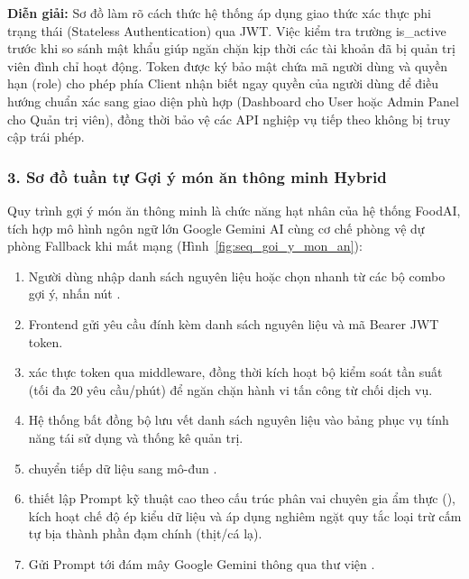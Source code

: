 \noindent\textbf{Diễn giải:} Sơ đồ làm rõ cách thức hệ thống áp dụng giao thức xác thực phi trạng thái (Stateless Authentication) qua JWT. Việc kiểm tra trường is\_active trước khi so sánh mật khẩu giúp ngăn chặn kịp thời các tài khoản đã bị quản trị viên đình chỉ hoạt động. Token được ký bảo mật chứa mã người dùng và quyền hạn (role) cho phép phía Client nhận biết ngay quyền của người dùng để điều hướng chuẩn xác sang giao diện phù hợp (Dashboard cho User hoặc Admin Panel cho Quản trị viên), đồng thời bảo vệ các API nghiệp vụ tiếp theo không bị truy cập trái phép.

\subsubsection{3. Sơ đồ tuần tự Gợi ý món ăn thông minh Hybrid}

Quy trình gợi ý món ăn thông minh là chức năng hạt nhân của hệ thống FoodAI, tích hợp mô hình ngôn ngữ lớn Google Gemini AI cùng cơ chế phòng vệ dự phòng Fallback khi mất mạng (Hình~\ref{fig:seq_goi_y_mon_an}):
\begin{enumerate}[leftmargin=1.6em, itemsep=2pt]
  \item Người dùng nhập danh sách nguyên liệu hoặc chọn nhanh từ các bộ combo gợi ý, nhấn nút .
  \item Frontend gửi yêu cầu  đính kèm danh sách nguyên liệu và mã Bearer JWT token.
  \item {} xác thực token qua middleware, đồng thời kích hoạt bộ kiểm soát tần suất  (tối đa 20 yêu cầu/phút) để ngăn chặn hành vi tấn công từ chối dịch vụ.
  \item Hệ thống bất đồng bộ lưu vết danh sách nguyên liệu vào bảng  phục vụ tính năng tái sử dụng và thống kê quản trị.
  \item {} chuyển tiếp dữ liệu sang mô-đun .
  \item {} thiết lập Prompt kỹ thuật cao theo cấu trúc phân vai chuyên gia ẩm thực (), kích hoạt chế độ ép kiểu dữ liệu  và áp dụng nghiêm ngặt quy tắc loại trừ cấm tự bịa thành phần đạm chính (thịt/cá lạ).
  \item Gửi Prompt tới đám mây Google Gemini thông qua thư viện .
\end{enumerate}

